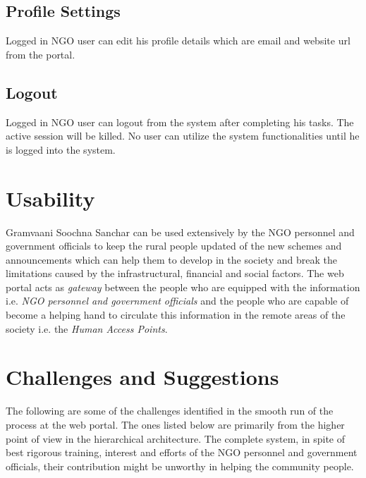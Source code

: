 \subsection{Profile Settings}
Logged in NGO user can edit his profile details which are email and website url from the portal.

\subsection{Logout}
Logged in NGO user can logout from the system after completing his tasks. The active session will be killed. No user can utilize the system functionalities until he is logged into the system.


\section{Usability}
Gramvaani Soochna Sanchar can be used extensively by the NGO personnel and government officials to keep the rural people updated of the new schemes and announcements which can help them to develop in the society and break the limitations caused by the infrastructural, financial and social factors. The web portal acts as \emph{gateway} between the people who are equipped with the information i.e. \emph{NGO personnel and government officials} and the people who are capable of become a helping hand to circulate this information in the remote areas of the society i.e. the \emph{Human Access Points}.

\section{Challenges and Suggestions}

The following are some of the challenges identified in the smooth run of the process at the web portal. The ones listed below are primarily from the higher point of view in the hierarchical architecture. The complete system, in spite of best rigorous training, interest and efforts of the NGO personnel and government officials, their contribution might be unworthy in helping the community people.


